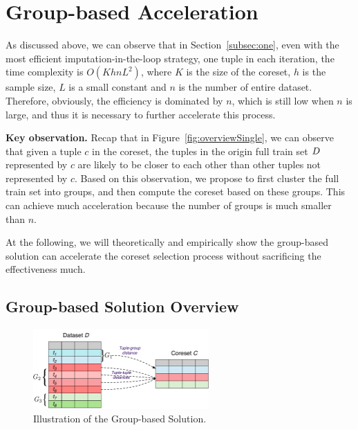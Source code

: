 

\section{Group-based Acceleration}
\label{group}

As discussed above, we can observe that in Section~\ref{subsec:one}, even with the most efficient imputation-in-the-loop  strategy, \ie  one tuple in  each iteration, the time complexity is  $O(KhnL^2)$, where $K$ is the size of the coreset, $h$ is the sample size, $L$ is a small constant and $n$ is the number of entire dataset. Therefore, obviously, the efficiency is dominated by $n$, which is still low when $n$ is large, and thus it  is necessary to further accelerate this process.

\noindent \textbf{Key observation.}   Recap that in Figure~\ref{fig:overviewSingle}, we can observe that  given a tuple $c$ in the coreset, the tuples in the origin full train set $D$ represented by $c$ are likely to be  closer to each other than other tuples not represented by $c$.
Based on this observation, we propose to first cluster the full train set into groups, and then compute the coreset based on these groups. This can achieve much acceleration because the number of groups is much smaller than $n$. 

At the following, we will theoretically and empirically show the group-based solution can accelerate the coreset selection process without sacrificing the effectiveness much.


\subsection{Group-based Solution Overview}

\begin{figure}[t]
    \centering
    \includegraphics[width=0.6\textwidth]{figs/Overview-gb}
    \caption{Illustration of the Group-based Solution.}
    \label{fig:overview-gb}
\end{figure}


